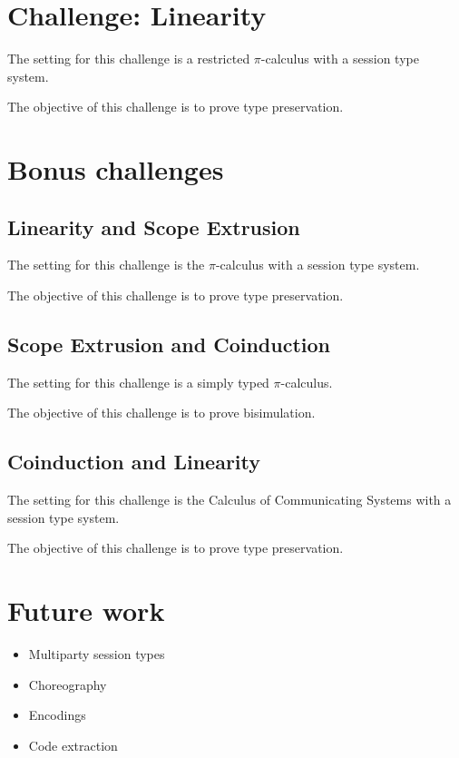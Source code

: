 \documentclass[a4paper]{article}
\begin{document}
\section{Challenge: Linearity}
The setting for this challenge is a restricted \( \pi \)-calculus with a session type system.

The objective of this challenge is to prove type preservation.

\section{Bonus challenges}

\subsection{Linearity and Scope Extrusion}
The setting for this challenge is the \( \pi \)-calculus with a session type system.

The objective of this challenge is to prove type preservation.

\subsection{Scope Extrusion and Coinduction}
The setting for this challenge is a simply typed \( \pi \)-calculus.

The objective of this challenge is to prove bisimulation.

\subsection{Coinduction and Linearity}
The setting for this challenge is the Calculus of Communicating Systems with a session type system.

The objective of this challenge is to prove type preservation.

\section{Future work}
\begin{itemize}
\item Multiparty session types
\item Choreography
\item Encodings
\item Code extraction
\end{itemize}
\end{document}
